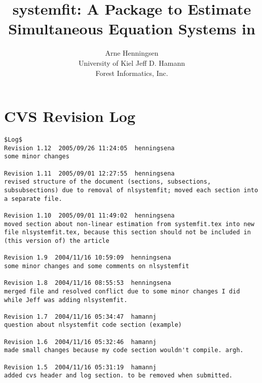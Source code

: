 \documentclass[article]{jss}
\author{Arne Henningsen\\University of Kiel\And
        Jeff D. Hamann\\ Forest Informatics, Inc. }
\title{systemfit: A Package to Estimate\\
       Simultaneous Equation Systems in \proglang{R}}
\begin{document}








\section{CVS Revision Log}
\begin{verbatim}
$Log$
Revision 1.12  2005/09/26 11:24:05  henningsena
some minor changes

Revision 1.11  2005/09/01 12:27:55  henningsena
revised structure of the document (sections, subsections, subsubsections) due to removal of nlsystemfit; moved each section into a separate file.

Revision 1.10  2005/09/01 11:49:02  henningsena
moved section about non-linear estimation from systemfit.tex into new file nlsystemfit.tex, because this section should not be included in (this version of) the article

Revision 1.9  2004/11/16 10:59:09  henningsena
some minor changes and some comments on nlsystemfit

Revision 1.8  2004/11/16 08:55:53  henningsena
merged file and resolved conflict due to some minor changes I did while Jeff was adding nlsystemfit.

Revision 1.7  2004/11/16 05:34:47  hamannj
question about nlsystemfit code section (example)

Revision 1.6  2004/11/16 05:32:46  hamannj
made small changes because my code section wouldn't compile. argh.

Revision 1.5  2004/11/16 05:31:19  hamannj
added cvs header and log section. to be removed when submitted.

\end{verbatim}




%
\end{document}
